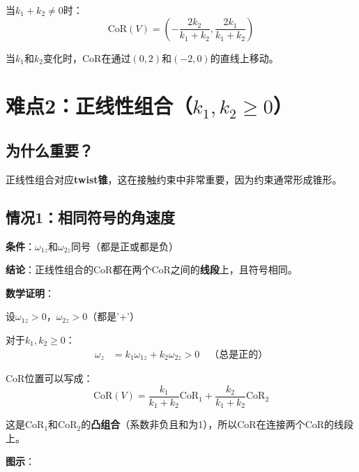 \documentclass[12pt,a4paper]{article}
\begin{document}
当$k_1 + k_2 \neq 0$时：
\begin{equation}
\text{CoR}(V) = \left(-\frac{2k_2}{k_1 + k_2}, \frac{2k_1}{k_1 + k_2}\right)
\end{equation}

当$k_1$和$k_2$变化时，CoR在通过$(0, 2)$和$(-2, 0)$的直线上移动。

\section{难点2：正线性组合（$k_1, k_2 \geq 0$）}

\subsection{为什么重要？}

正线性组合对应\textbf{twist锥}，这在接触约束中非常重要，因为约束通常形成锥形。

\subsection{情况1：相同符号的角速度}

\textbf{条件}：$\omega_{1z}$和$\omega_{2z}$同号（都是正或都是负）

\textbf{结论}：正线性组合的CoR都在两个CoR之间的\textbf{线段}上，且符号相同。

\textbf{数学证明}：

设$\omega_{1z} > 0$，$\omega_{2z} > 0$（都是'+'）

对于$k_1, k_2 \geq 0$：
\begin{align}
\omega_z &= k_1 \omega_{1z} + k_2 \omega_{2z} > 0 \quad \text{（总是正的）}
\end{align}

CoR位置可以写成：
\begin{equation}
\text{CoR}(V) = \frac{k_1}{k_1 + k_2} \text{CoR}_1 + \frac{k_2}{k_1 + k_2} \text{CoR}_2
\end{equation}

这是$\text{CoR}_1$和$\text{CoR}_2$的\textbf{凸组合}（系数非负且和为1），所以CoR在连接两个CoR的线段上。

\textbf{图示}：

\begin{center}
\end{center}
\end{document}
